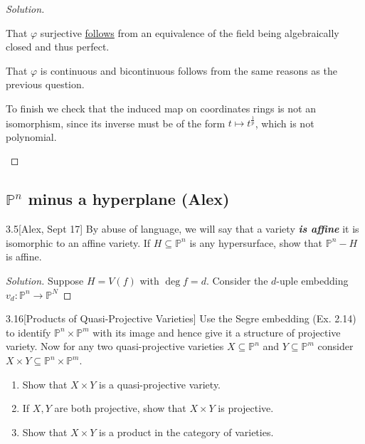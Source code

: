 \begin{proof}[Solution]
\begin{enumerate}[label=\alph*.]
	That $\varphi$ surjective \href{https://en.wikipedia.org/wiki/Perfect_field}{follows} from an equivalence of the field being algebraically closed and thus perfect.

	That $\varphi$ is continuous and bicontinuous follows from the same reasons as the previous question.

	To finish we check that the induced map on coordinates rings is not an isomorphism, since its inverse must be of the form $t\mapsto t^{\frac{1}{p}}$, which is not polynomial.

\end{enumerate}
\end{proof}

\subsection{$\mathbb{P}^n$ minus a hyperplane (Alex)}

\begin{manualexercise}{3.5}[Alex, Sept 17]
	By abuse of language, we will say that a variety \textit{\textbf{is affine}} it is isomorphic to an affine variety. If $H\subseteq \mathbb{P}^n$ is any hypersurface, show that $\mathbb{P}^n-H$ is affine.
\end{manualexercise}

\begin{proof}[Solution]\leavevmode
	Suppose $H=V(f)$ with  $\operatorname{deg}f=d$. Consider the $d$-uple embedding $v_d:\mathbb{P}^n\to \mathbb{P}^N$
\end{proof}


\begin{manualexercise}{3.16}[Products of Quasi-Projective Varieties]
	Use the Segre embedding (Ex. 2.14) to identify $\mathbb{P}^n\times\mathbb{P}^m$ with its image and hence give it a structure of projective variety. Now for any two quasi-projective varieties $X\subseteq\mathbb{P}^n$ and $Y\subseteq\mathbb{P}^m$ consider $X\times Y\subseteq\mathbb{P}^n\times\mathbb{P}^m$.
	\begin{enumerate}[label*=(\alph*)]
		\item Show that $X\times Y$ is a quasi-projective variety.
		\item If $X,Y$ are both projective, show that $X\times Y$ is projective.
		\item Show that $X\times Y$ is a product in the category of varieties.
	\end{enumerate}
\end{manualexercise}

